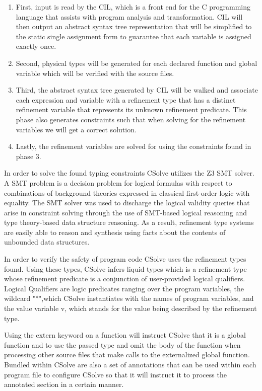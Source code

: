 \begin{enumerate}
	\item First, input is read by the CIL, which is a front end for the C programming language that assists with program analysis and transformation. CIL will then output an abstract syntax tree representation that will be simplified to the static single assignment form to guarantee that each variable is assigned exactly once.
	\item Second, physical types will be generated for each declared function and global variable which will be verified with the source files.
	\item Third, the abstract syntax tree generated by CIL will be walked and associate each expression and variable with a refinement type that has a distinct refinement variable that represents its unknown refinement predicate.  This phase also generates constraints such that when solving for the refinement variables we will get a correct solution.
	\item Lastly, the refinement variables are solved for using the constraints found in phase 3.
\end{enumerate}

In order to solve the found typing constraints CSolve utilizes the Z3 SMT solver.  A SMT problem is a decision problem for logical formulas with respect to combinations of background theories expressed in classical first-order logic with equality. The SMT solver was used to discharge the logical validity queries that arise in constraint solving through the use of SMT-based logical reasoning and type theory-based data structure reasoning. As a result, refinement type systems are easily able to reason and synthesis using facts about the contents of unbounded data structures.

In order to verify the safety of program code CSolve uses the refinement types found. Using these types, CSolve infers liquid types which is a refinement type whose refinement predicate is a conjunction of user-provided logical qualifiers. Logical Qualifiers are logic predicates ranging over the program variables, the wildcard "*",which CSolve instantiates with the names of program variables, and the value variable v, which stands for the value being described by the refinement type.

Using the extern keyword on a function will instruct CSolve that it is a global function and to use the passed type and omit the body of the function when processing other source files that make calls to the externalized global function. Bundled within CSolve are also a set of annotations that can be used within each program file to configure CSolve so that it will instruct it to process the annotated section in a certain manner.  

